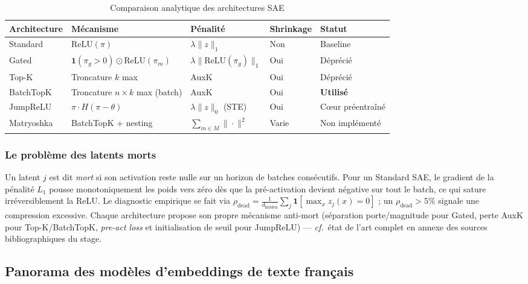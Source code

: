 \documentclass[11pt]{article}
\newcommand{\ind}{\mathbf{1}}
\begin{document}
\begin{table}[h!]
\centering
\caption{Comparaison analytique des architectures SAE}
\label{tab:sae-archs}
\vspace{0.5em}\small
\begin{tabular}{@{}lllll@{}}
\toprule
\textbf{Architecture} & \textbf{Mécanisme} & \textbf{Pénalité}
  & \textbf{Shrinkage} & \textbf{Statut} \\ \midrule
Standard  & $\text{ReLU}(\pi)$                          & $\lambda\|z\|_1$          & Non  & Baseline \\
Gated     & $\ind(\pi_g>0) \odot \text{ReLU}(\pi_m)$   & $\lambda\|\text{ReLU}(\pi_g)\|_1$ & Oui & Déprécié\\
Top-K     & Troncature $k$ max                          & AuxK                      & Oui  & Déprécié \\
BatchTopK & Troncature $n{\times}k$ max (batch)         & AuxK                      & Oui  & \textbf{Utilisé} \\
JumpReLU  & $\pi \cdot H(\pi - \theta)$                 & $\lambda\|z\|_0$ (STE)    & Oui  & Cœur préentraîné \\
Matryoshka & BatchTopK + nesting                        & $\sum_{m\in M}\|\cdot\|^2$ & Varie & Non implémenté \\ \bottomrule
\end{tabular}
\end{table}

\subsubsection{Le problème des latents morts}

Un latent $j$ est dit \emph{mort} si son activation reste nulle sur un
horizon de batches consécutifs. Pour un Standard SAE, le gradient de la
pénalité $L_1$ pousse monotoniquement les poids vers zéro dès que la
pré-activation devient négative sur tout le batch, ce qui sature
irréversiblement la ReLU. Le diagnostic empirique se fait via
$\rho_\text{dead} = \frac{1}{d_\text{hidden}} \sum_j \ind[\max_x z_j(x) = 0]$ ;
un $\rho_\text{dead} > 5\%$ signale une compression excessive. Chaque
architecture propose son propre mécanisme anti-mort (séparation porte/magnitude
pour Gated, perte AuxK pour Top-K/BatchTopK, \emph{pre-act loss} et
initialisation de seuil pour JumpReLU) --- \emph{cf.}~état de l'art complet en
annexe des sources bibliographiques du stage.

\subsection{Panorama des modèles d'embeddings de texte français}
\end{document}
